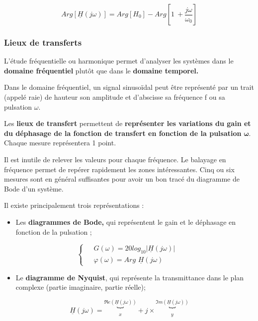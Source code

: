 \[Arg\left\lbrack \underline{H}(j\omega) \right\rbrack = Arg\left\lbrack H_{0} \right\rbrack - Arg\left\lbrack 1\  + \frac{j\omega}{\omega_{0}} \right\rbrack\]

\hypertarget{mod-lieux-de-transferts}{%
\subsubsection{Lieux de transferts}\label{mod-lieux-de-transferts}}

L'étude fréquentielle ou harmonique permet d'analyser les systèmes dans le \textbf{domaine fréquentiel} plutôt que dans le \textbf{domaine temporel.}

Dans le domaine fréquentiel, un signal sinusoïdal peut être représenté par un trait (appelé raie) de hauteur son amplitude et d'abscisse sa fréquence f ou sa pulsation \(\omega\).

Les \textbf{lieux de transfert} permettent de \textbf{représenter les variations du gain et du déphasage de la fonction de transfert en fonction de la pulsation} \(\mathbf{\omega}\). Chaque mesure représentera 1 point.

Il est inutile de relever les valeurs pour chaque fréquence. Le balayage en fréquence permet de repérer rapidement les zones intéressantes. Cinq ou six mesures sont en général suffisantes pour avoir un bon tracé du diagramme de Bode d'un système.

Il existe principalement trois représentations :

\begin{itemize}
\item
  Les \textbf{diagrammes de Bode,} qui représentent le gain et le déphasage en fonction de la pulsation ;
\end{itemize}

\[\left\{ \begin{aligned}
 & \mspace{6mu} G(\omega) = 20log_{10}\left| \underline{H}(j\omega) \right|\mspace{6mu} \\
 & \mspace{6mu}\varphi(\omega) = Arg\mspace{6mu}\underline{H}(j\omega)
\end{aligned} \right.\ \]

\begin{itemize}
\item
  Le \textbf{diagramme de Nyquist}, qui représente la transmittance dans le plan complexe (partie imaginaire, partie réelle);
\end{itemize}

\[\underline{H}(j\omega) = \underset{x}{\overset{\mathfrak{R}e(\underline{H}(j\omega))}{︸}} + j \times \underset{y}{\overset{\mathfrak{I}m(\underline{H}(j\omega))}{︸}}\]

